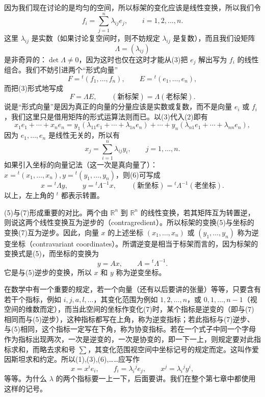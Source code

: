 因为我们现在讨论的是均匀的空间，所以标架的变化应该是线性变换，所以我们令
\begin{equation}
 f_i=\sum_{j=1}^n\lambda_{ij}e_j,\qquad i=1,2,\ldots,n.
 \tag{3}
\end{equation}
这里 $\lambda_{ij}$ 是实数（如果讨论复空间时，则不妨规定 $\lambda_{ij}$ 是复数），而且我们设矩阵
\begin{equation}
 \Lambda=(\lambda_{ij})
 \tag{4}
\end{equation}
是非奇异的：$\det\Lambda\ne0$，因为这时也仅在这时才能从(3)把 $e_j$ 解出写为 $f_i$ 的线性组合。我们不妨引进两个“形式向量”
\[
 F={}^{t}(f_1,\ldots,f_n),\qquad E={}^{t}(e_1,\ldots,e_n),
\]
而把(3)形式地写成
\begin{equation}
 F=\Lambda E,
 \qquad (\text{新标架})=\Lambda(\text{老标架}).
 \tag{5}
\end{equation}
说是“形式向量”是因为真正的向量的分量应该是实数或复数，而不是向量 $e_i$ 或 $f_i$，我们这里只是借用矩阵的形式运算法则而已。以(3)代入(2)即有
\[
 x_1e_1+\cdots+x_ne_n
 =y_1(\lambda_{11}e_1+\cdots+\lambda_{1n}e_n)+\cdots+y_n(\lambda_{n1}e_1+\cdots+\lambda_{nn}e_n),
\]
因为 $e_1,\ldots,e_n$ 是线性无关的，所以有
\begin{equation}
 x_j=\sum_{i=1}^n\lambda_{ij}y_i,\qquad j=1,\ldots,n.
 \tag{6}
\end{equation}
如果引入坐标的向量记法（这一次是真向量了）：$x={}^{t}(x_1,\ldots,x_n),y={}^{t}(y_1,\ldots,y_n)$，则(6)可写成
\begin{equation}
 x={}^{t}\!\Lambda y,
 \qquad y={}^{t}\!\Lambda^{-1}x,
 \qquad (\text{新坐标})={}^{t}\!\Lambda^{-1}(\text{老坐标}).
 \tag{7}
\end{equation}
以上，左上角的 ${}^{t}$ 都表示转置。

(5)与(7)形成重要的对比。两个由 $\mathbb R^n$ 到 $\mathbb R^n$ 的线性变换，若其矩阵互为转置逆，则说这两个线性变换互为逆步的（contragredient）。所以标架的变换(5)与坐标的变换(7)互为逆步。因此，向量 $x$ 的上述坐标 $(x_1,\ldots,x_n)$ 或 $(y_1,\ldots,y_n)$ 称为逆变坐标（contravariant coordinates）。所谓逆变是相当于标架而言的，因为标架的变换式是(5)，而坐标的变换为
\begin{equation}
 y=Ax,\qquad A={}^{t}\!\Lambda^{-1}.
 \tag{8}
\end{equation}
它是与(5)逆步的变换，所以 $x$ 和 $y$ 称为逆变坐标。

在数学中有一个重要的规定，若一个向量（还有以后要讲的张量）等等，只要含有若干个指标，例如 $i,j,a,l,\ldots$，其变化范围为例如 $1,2,\ldots,n$，或 $0,1,\ldots,n-1$（视空间的维数而定），而当此空间的坐标作变化(7)时，某个指标是逆变的（即与(7)相同而与(5)逆步），这种指标都写在上角，称为逆变指标；若此指标与(7)逆步、与(5)相同，这个指标一定写在下角，称为协变指标。若在一个式子中同一个字母作为指标出现两次，一次是逆变的，一次是协变的，即一下一上，则规定要对此指标求和，而略去求和号 $\sum$，其变化范围视空间中坐标记号的规定而定。这叫作爱因斯坦求和约定。所以(1),(3),(6),……应写作
\[
 x=x^ie_i,\qquad f_i=\lambda_i{}^je_j,\qquad x^j=\lambda_i{}^j y^i,
\]
等等。为什么 $\lambda$ 的两个指标要一上一下，后面要讲。我们在整个第七章中都使用这样的记号。

